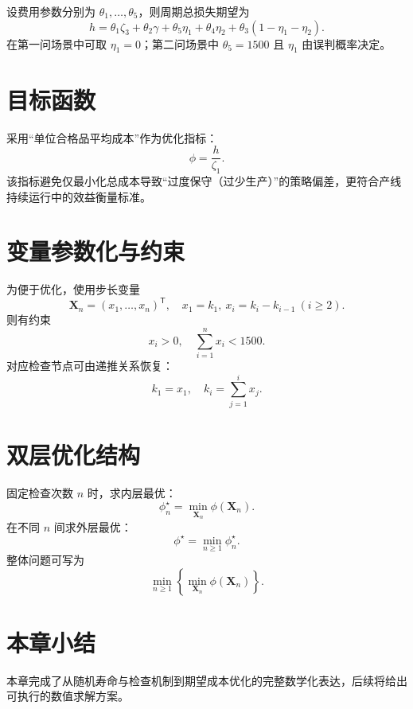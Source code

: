 设费用参数分别为 $\theta_1,\ldots,\theta_5$，则周期总损失期望为
\begin{equation}
h=\theta_1\zeta_3+\theta_2\gamma+\theta_5\eta_1+\theta_4\eta_2+\theta_3(1-\eta_1-\eta_2).
\label{eq:h}
\end{equation}
在第一问场景中可取 $\eta_1=0$；第二问场景中 $\theta_5=1500$ 且 $\eta_1$ 由误判概率决定。

\section{目标函数}
采用“单位合格品平均成本”作为优化指标：
\begin{equation}
\phi=\frac{h}{\zeta_1}.
\label{eq:phi}
\end{equation}
该指标避免仅最小化总成本导致“过度保守（过少生产）”的策略偏差，更符合产线持续运行中的效益衡量标准。

\section{变量参数化与约束}
为便于优化，使用步长变量
\[
\mathbf X_n=(x_1,\ldots,x_n)^\mathsf T,\quad x_1=k_1,\ x_i=k_i-k_{i-1}\ (i\ge2).
\]
则有约束
\[
x_i>0,\quad \sum_{i=1}^{n}x_i<1500.
\]
对应检查节点可由递推关系恢复：
\[
k_1=x_1,\quad k_i=\sum_{j=1}^{i}x_j.
\]

\section{双层优化结构}
固定检查次数 $n$ 时，求内层最优：
\begin{equation}
\phi_n^\star=\min_{\mathbf X_n}\phi(\mathbf X_n).
\label{eq:inner}
\end{equation}
在不同 $n$ 间求外层最优：
\begin{equation}
\phi^\star=\min_{n\ge1}\phi_n^\star.
\label{eq:outer}
\end{equation}
整体问题可写为
\[
\min_{n\ge1}\left\{\min_{\mathbf X_n}\phi(\mathbf X_n)\right\}.
\]

\section{本章小结}
本章完成了从随机寿命与检查机制到期望成本优化的完整数学化表达，后续将给出可执行的数值求解方案。
